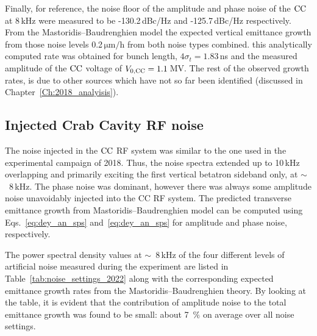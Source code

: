 Finally, for reference, the noise floor of the amplitude and phase noise of the ${\mathrm{CC}}$ at 8\,kHz were measured to be -130.2\,dBc/Hz and -125.7\,dBc/Hz respectively. From the Mastoridis--Baudrenghien model the expected vertical emittance growth from those noise levels 0.2\,$\mathrm{\mu m/h}$ from both noise types combined. this analytically computed rate was obtained for bunch length, $4\sigma_t=1.83$\,ns and the measured amplitude of the ${\mathrm{CC}}$ voltage of ${V_\mathrm{0, CC}}=1.1$\,MV.
The rest of the observed growth rates, is due to other sources which have not so far been identified (discussed in Chapter~\ref{Ch:2018_analyisis}).



\subsection{Injected Crab Cavity RF noise}\label{sec:injected_cc_noise_2022}

The noise injected in the ${\mathrm{CC}}$ RF system was similar to the one used in the experimental campaign of 2018. Thus, the noise spectra extended up to 10\,kHz overlapping and primarily exciting the first vertical betatron sideband only, at $\sim$~8\,kHz. The phase noise was dominant, however there was always some amplitude noise unavoidably injected into the CC RF system. The predicted transverse emittance growth from Mastoridis--Baudrenghien model can be computed using Eqs.~\eqref{eq:dey_an_sps} and~\eqref{eq:dey_an_sps} for amplitude and phase noise, respectively.

The power spectral density values at $\sim$~8\,kHz of the four different levels of artificial noise measured during the experiment are listed in Table~\ref{tab:noise_settings_2022} along with the corresponding expected emittance growth rates from the Mastoridis--Baudrenghien theory. By looking at the table, it is evident that the contribution of amplitude noise to the total emittance growth was found to be small: about 7~$\%$ on average over all noise settings.





